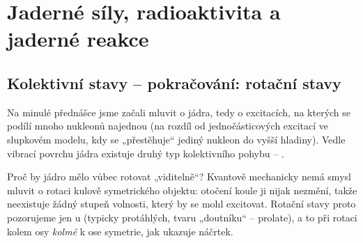 \section{Jaderné síly, radioaktivita a jaderné reakce}
\providecommand{\jcCtyrKruh}[1]{\text{\tikz[baseline=(X.base)]\node[draw,circle,inner sep=0.6pt,font=\scriptsize](X){#1};}}

\subsection{Kolektivní stavy -- pokračování: rotační stavy}

Na minulé přednášce jsme začali mluvit o  jádra, tedy o excitacích,
na kterých se podílí mnoho nukleonů najednou (na rozdíl od jednočásticových excitací ve
slupkovém modelu, kdy se „přestěhuje“ jediný nukleon do vyšší hladiny). Vedle vibrací povrchu
jádra existuje druhý typ kolektivního pohybu -- .

Proč by jádro mělo vůbec rotovat „viditelně“? Kvantově mechanicky nemá smysl mluvit o rotaci
kulově symetrického objektu: otočení koule ji nijak nezmění, takže neexistuje žádný stupeň volnosti,
který by se mohl excitovat. Rotační stavy proto pozorujeme jen u 
(typicky protáhlých, tvaru „doutníku“ -- prolate), a to při rotaci kolem osy \emph{kolmé} k ose symetrie,
jak ukazuje náčrtek.

\begin{center}
\end{center}

